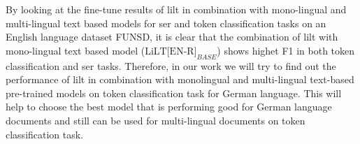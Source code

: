 By looking at the fine-tune results of \acrshort{lilt} in combination with mono-lingual and multi-lingual text based models for \acrshort{ser} and token classification tasks on an English language dataset FUNSD, it is clear that the combination of \acrshort{lilt} with mono-lingual text based model (\(\text{LiLT[EN-R]}_{BASE}\)) shows highet F1 in both token classification and \acrshort{ser} tasks. Therefore, in our work we will try to find out the performance of \acrshort{lilt} in combination with monolingual and multi-lingual text-based pre-trained models on token classification task for German language. This will help to choose the best model that is performing good for German language documents and still can be used for multi-lingual documents on token classification task.    